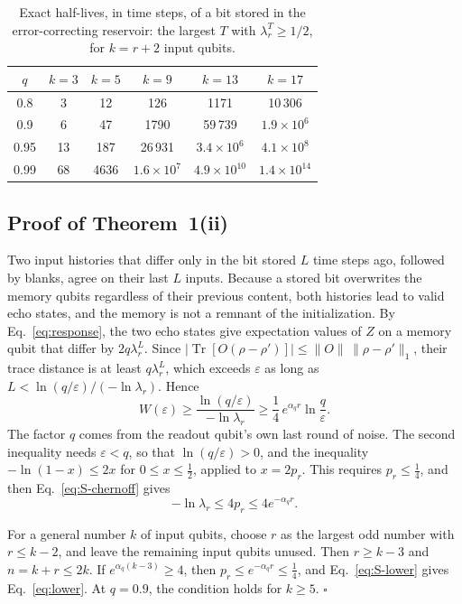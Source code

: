 \documentclass[aps,prl,twocolumn,superscriptaddress,floatfix]{revtex4-2}
\theoremstyle{plain}
\newcommand{\tr}{\operatorname{Tr}}
\newcommand{\Norm}[1]{\lVert #1\rVert}
\begin{document}
\begin{table}[t]
\caption{Exact half-lives, in time steps, of a bit stored in the error-correcting reservoir: the largest $T$ with $\lambda_r^T\ge1/2$, for $k=r+2$ input qubits.}
\label{tabS:halflife}
\begin{ruledtabular}
\begin{tabular}{cccccc}
$q$ & $k=3$ & $k=5$ & $k=9$ & $k=13$ & $k=17$ \\ \hline
0.8 & 3 & 12 & 126 & 1171 & 10\,306 \\
0.9 & 6 & 47 & 1790 & 59\,739 & $1.9\times10^{6}$ \\
0.95 & 13 & 187 & 26\,931 & $3.4\times10^{6}$ & $4.1\times10^{8}$ \\
0.99 & 68 & 4636 & $1.6\times10^{7}$ & $4.9\times10^{10}$ & $1.4\times10^{14}$ \\
\end{tabular}
\end{ruledtabular}
\end{table}

\subsection{Proof of Theorem~1(ii)}
\label{sm:lowerbound}

Two input histories that differ only in the bit stored $L$ time steps ago, followed by blanks, agree on their last $L$ inputs. Because a stored bit overwrites the memory qubits regardless of their previous content, both histories lead to valid echo states, and the memory is not a remnant of the initialization. By Eq.~\eqref{eq:response}, the two echo states give expectation values of $Z$ on a memory qubit that differ by $2q\lambda_r^L$. Since $|\tr[O(\rho-\rho')]|\le\Norm O\,\Norm{\rho-\rho'}_1$, their trace distance is at least $q\lambda_r^L$, which exceeds $\varepsilon$ as long as $L<\ln(q/\varepsilon)/(-\ln\lambda_r)$. Hence
\begin{equation}
W(\varepsilon)\ge\frac{\ln(q/\varepsilon)}{-\ln\lambda_r}\ge\frac14\,e^{\alpha_qr}\ln\frac q\varepsilon .
\label{eq:S-lower}
\end{equation}
The factor $q$ comes from the readout qubit's own last round of noise. The second inequality needs $\varepsilon<q$, so that $\ln(q/\varepsilon)>0$, and the inequality $-\ln(1-x)\le2x$ for $0\le x\le\frac12$, applied to $x=2p_r$. This requires $p_r\le\frac14$, and then Eq.~\eqref{eq:S-chernoff} gives
\[
-\ln\lambda_r\le4p_r\le4e^{-\alpha_qr}.
\]

For a general number $k$ of input qubits, choose $r$ as the largest odd number with $r\le k-2$, and leave the remaining input qubits unused. Then $r\ge k-3$ and $n=k+r\le2k$. If $e^{\alpha_q(k-3)}\ge4$, then $p_r\le e^{-\alpha_qr}\le\frac14$, and Eq.~\eqref{eq:S-lower} gives Eq.~\eqref{eq:lower}. At $q=0.9$, the condition holds for $k\ge5$. \hfill$\square$
\end{document}
